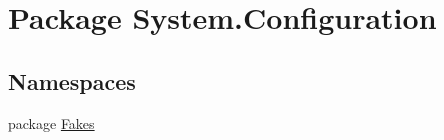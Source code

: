 \hypertarget{namespace_system_1_1_configuration}{\section{Package System.\-Configuration}
\label{namespace_system_1_1_configuration}
}
\subsection*{Namespaces}
\begin{DoxyCompactItemize}
\item 
package \hyperlink{namespace_system_1_1_configuration_1_1_fakes}{Fakes}
\end{DoxyCompactItemize}
